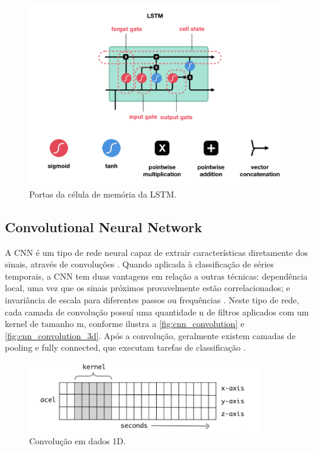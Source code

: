 \begin{figure}[h!]
  \centering
  \caption{Portas da célula de memória da LSTM.}
   \label{fig:cell_lstm_gates}
   \includegraphics[width=1\textwidth]{figuras/fig2_3_1.png}
\end{figure}

\subsection{Convolutional Neural Network}

A CNN é um tipo de rede neural capaz de extrair características diretamente dos sinais, através de convoluções \cite{Dixon2019}. Quando aplicada à classificação de séries temporais, a CNN tem duas vantagens em relação a outras técnicas: dependência local, uma vez que os sinais próximos provavelmente estão correlacionados; e invariância de escala para diferentes passos ou frequências \cite{Wang2019}. Neste tipo de rede, cada camada de convolução possuí uma quantidade n de filtros aplicados com um kernel de tamanho m, conforme ilustra a \autoref{fig:cnn_convolution} e \autoref{fig:cnn_convolution_3d}. Após a convolução, geralmente existem camadas de pooling e fully connected, que executam tarefas de classificação \cite{Wang2019}.

\begin{figure}[h!]
  \centering
  \caption{Convolução em dados 1D.}
   \label{fig:cnn_convolution}
   \includegraphics[width=0.9\textwidth]{figuras/cnn_kernel.png}
\end{figure}

